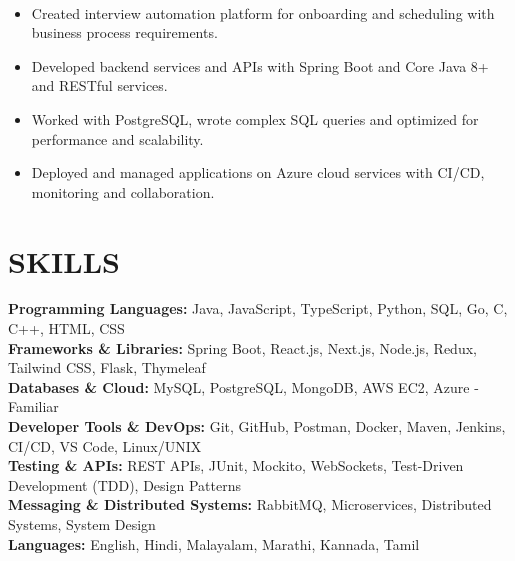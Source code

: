 \documentclass[10pt,a4paper]{article}
\begin{document}
\noindent
{}\\[-12pt]

\begin{itemize}

\item Created interview automation platform for onboarding and scheduling with business process requirements.

\item Developed backend services and APIs with Spring Boot and Core Java 8+ and RESTful services.

\item Worked with PostgreSQL, wrote complex SQL queries and optimized for performance and scalability.

\item Deployed and managed applications on Azure cloud services with CI/CD, monitoring and collaboration.

\end{itemize}
\section*{SKILLS}

\small

\textbf{Programming Languages:}
Java, JavaScript, TypeScript, Python, SQL, Go, C, C++, HTML, CSS
\\[2pt]
\textbf{Frameworks \& Libraries:}
Spring Boot, React.js, Next.js, Node.js, Redux, Tailwind CSS, Flask, Thymeleaf
\\[2pt]
\textbf{Databases \& Cloud:}
MySQL, PostgreSQL, MongoDB, AWS EC2, Azure - Familiar
\\[2pt]
\textbf{Developer Tools \& DevOps:}
Git, GitHub, Postman, Docker, Maven, Jenkins, CI/CD, VS Code, Linux/UNIX
\\[2pt]
\textbf{Testing \& APIs:}
REST APIs, JUnit, Mockito, WebSockets, Test-Driven Development (TDD), Design Patterns
\\[2pt]
\textbf{Messaging \& Distributed Systems:}
RabbitMQ, Microservices, Distributed Systems, System Design
\\[2pt]
\textbf{Languages:}
English, Hindi, Malayalam, Marathi, Kannada, Tamil
\end{document}
